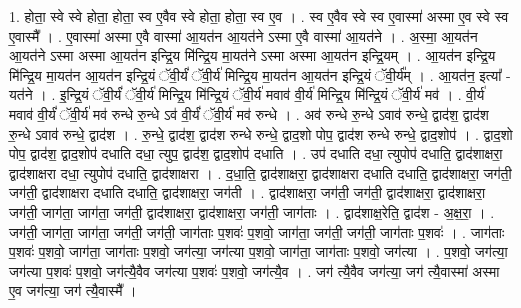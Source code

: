 \documentclass[17pt]{extarticle}
\begin{document}
1. होता॒ स्वे स्वे होता॒ होता॒ स्व ए॒वैव स्वे होता॒ होता॒ स्व ए॒व । . स्व ए॒वैव स्वे स्व ए॒वास्मा॑ अस्मा ए॒व स्वे स्व ए॒वास्मै᳚ । . ए॒वास्मा॑ अस्मा ए॒वै वास्मा॑ आ॒यत॑न आ॒यत॑ने ऽस्मा ए॒वै वास्मा॑ आ॒यत॑ने । . अ॒स्मा॒ आ॒यत॑न आ॒यत॑ने ऽस्मा अस्मा आ॒यत॑न इन्द्रि॒य मि॑न्द्रि॒य मा॒यत॑ने ऽस्मा अस्मा आ॒यत॑न इन्द्रि॒यम् । . आ॒यत॑न इन्द्रि॒य मि॑न्द्रि॒य मा॒यत॑न आ॒यत॑न इन्द्रि॒यं ॅवी॒र्यं॑ ॅवी॒र्य॑ मिन्द्रि॒य मा॒यत॑न आ॒यत॑न इन्द्रि॒यं ॅवी॒र्य᳚म् । . आ॒यत॑न॒ इत्या᳚ - यत॑ने । . इ॒न्द्रि॒यं ॅवी॒र्यं॑ ॅवी॒र्य॑ मिन्द्रि॒य मि॑न्द्रि॒यं ॅवी॒र्य॑ मवाव॑ वी॒र्य॑ मिन्द्रि॒य मि॑न्द्रि॒यं ॅवी॒र्य॑ मव॑ । . वी॒र्य॑ मवाव॑ वी॒र्यं॑ ॅवी॒र्य॑ मव॑ रुन्धे रु॒न्धे ऽव॑ वी॒र्यं॑ ॅवी॒र्य॑ मव॑ रुन्धे । . अव॑ रुन्धे रु॒न्धे ऽवाव॑ रुन्धे॒ द्वाद॑श॒ द्वाद॑श रु॒न्धे ऽवाव॑ रुन्धे॒ द्वाद॑श । . रु॒न्धे॒ द्वाद॑श॒ द्वाद॑श रुन्धे रुन्धे॒ द्वाद॒शो पोप॒ द्वाद॑श रुन्धे रुन्धे॒ द्वाद॒शोप॑ । . द्वाद॒शो पोप॒ द्वाद॑श॒ द्वाद॒शोप॑ दधाति दधा॒ त्युप॒ द्वाद॑श॒ द्वाद॒शोप॑ दधाति । . उप॑ दधाति दधा॒ त्युपोप॑ दधाति॒ द्वाद॑शाक्षरा॒ द्वाद॑शाक्षरा दधा॒ त्युपोप॑ दधाति॒ द्वाद॑शाक्षरा । . द॒धा॒ति॒ द्वाद॑शाक्षरा॒ द्वाद॑शाक्षरा दधाति दधाति॒ द्वाद॑शाक्षरा॒ जग॑ती॒ जग॑ती॒ द्वाद॑शाक्षरा दधाति दधाति॒ द्वाद॑शाक्षरा॒ जग॑ती । . द्वाद॑शाक्षरा॒ जग॑ती॒ जग॑ती॒ द्वाद॑शाक्षरा॒ द्वाद॑शाक्षरा॒ जग॑ती॒ जाग॑ता॒ जाग॑ता॒ जग॑ती॒ द्वाद॑शाक्षरा॒ द्वाद॑शाक्षरा॒ जग॑ती॒ जाग॑ताः । . द्वाद॑शाक्ष॒रेति॒ द्वाद॑श - अ॒क्ष॒रा॒ । . जग॑ती॒ जाग॑ता॒ जाग॑ता॒ जग॑ती॒ जग॑ती॒ जाग॑ताः प॒शवः॑ प॒शवो॒ जाग॑ता॒ जग॑ती॒ जग॑ती॒ जाग॑ताः प॒शवः॑ । . जाग॑ताः प॒शवः॑ प॒शवो॒ जाग॑ता॒ जाग॑ताः प॒शवो॒ जग॑त्या॒ जग॑त्या प॒शवो॒ जाग॑ता॒ जाग॑ताः प॒शवो॒ जग॑त्या । . प॒शवो॒ जग॑त्या॒ जग॑त्या प॒शवः॑ प॒शवो॒ जग॑त्यै॒वैव जग॑त्या प॒शवः॑ प॒शवो॒ जग॑त्यै॒व । . जग॑ त्यै॒वैव जग॑त्या॒ जग॑ त्यै॒वास्मा॑ अस्मा ए॒व जग॑त्या॒ जग॑ त्यै॒वास्मै᳚ । \newline
\end{document}
